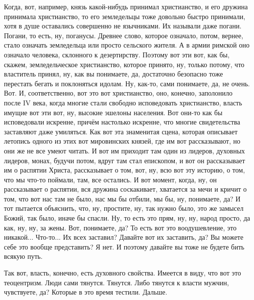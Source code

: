 Когда, вот, например, князь какой-нибудь принимал христианство, и его
дружина принимала христианство, то его земледельцы тоже довольно быстро
принимали, хотя в душе оставались совершенно не язычниками. Их называли даже
погани. Погани, то есть, ну, поганусы. Древнее слово, которое означало, потом,
вернее, стало означать земледельца или просто сельского жителя. А в армии
римской оно означало человека, склонного к дезертирству. Поэтому вот эти вот,
как бы, скажем, земледельческое христианство, которое принято, ну, только
потому, что властитель принял, ну, как вы понимаете, да, достаточно безопасно
тоже перестать бегать и поклоняться идолам. Ну, как-то, сами понимаете, да, не
очень. Вот. И, соответственно, вот это вот христианство, оно, конечно,
заполонило после IV века, когда многие стали свободно исповедовать христианство,
власть имущие вот эти вот, ну, высокие эшелоны населения. Вот они-то как бы
исповедовали искренне, причём настолько искренне, что многие свидетельства
заставляют даже умиляться. Как вот эта знаменитая сцена, которая описывает
летопись одного из этих вот мировинских князей, где им вот рассказывают, но они
же не все умеют читать. И вот им приходит там один из лидеров, духовных лидеров,
монах, будучи потом, вдруг там стал епископом, и вот он рассказывает им о
распятии Христа, рассказывает о том, вот, ну, всю вот эту историю, о том, что мы
что-то поймали, там, все остались. И вот момент, когда, ну, он рассказывает о
распятии, вся дружина соскакивает, хватается за мечи и кричит о том, что вот нас
там не было, нас мы бы отбили, мы бы, ну, понимаете, да? И тот пытается
объяснить, что, ну, простите, ну, так нужно было, это же замысел Божий, так
было, иначе бы спасли. Ну, то есть это прям, ну, ну, народ просто, да как, ну,
ну, за жены. Вот, понимаете, да? То есть вот это воодушевление, это никакой...
Что-то... Их всех заставил? Давайте вот их заставить, да? Вы можете себе это
вообще представить? Я нет. И поэтому давайте вы тоже не будете бить всякую путь.

Так вот, власть, конечно, есть духовного свойства. Имеется в виду, что вот это
теоцентризм. Люди сами тянутся. Тянутся. Либо тянутся к власти мужчин,
чувствуете, да? Которые в это время тестили. Дальше. 

